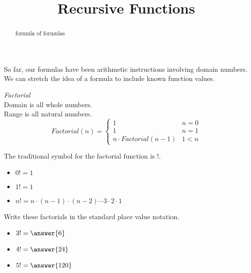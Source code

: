 \documentclass{ximera}
\title{Recursive Functions}
\begin{document}
\begin{abstract}
formula of formulas
\end{abstract}
\maketitle



So far, our formulas have been arithmetic instructions involving domain numbers.  We can stretch the idea of a formula to include known function values.









\begin{example}  \textit{Factorial} \\



Domain is all whole numbers. \\
Range is all natural numbers. \\




\[
Factorial(n) = 
\begin{cases}
  1 & n = 0 \\
  1 & n = 1 \\ 
  n \cdot Factorial(n-1) & 1 < n
\end{cases}
\]

The traditional symbol for the factorial function is !.


\begin{itemize}
  \item $0! = 1$
  \item $1! = 1$
  \item $n! = n \cdot (n-1) \cdot (n-2) \cdots 3 \cdot 2 \cdot 1$
\end{itemize}





\begin{question} Write these factorials in the standard place value notation.


\begin{itemize}
\item $3! = \answer{6}$
\item $4! = \answer{24}$
\item $5! = \answer{120}$
\end{itemize}


\end{question}



\end{example}
\end{document}
